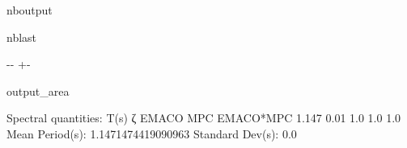 \documentclass[letterpaper,10pt,english]{sphinxmanual}
\begin{document}
\begin{sphinxuseclass}{nboutput}
\begin{sphinxuseclass}{nblast}
{

\kern-\sphinxverbatimsmallskipamount\kern-\baselineskip
\kern+\FrameHeightAdjust\kern-\fboxrule
\vspace{\nbsphinxcodecellspacing}

\begin{sphinxuseclass}{output_area}
\begin{sphinxuseclass}{}


\begin{sphinxVerbatim}[commandchars=\\\{\}]
Spectral quantities:
       T(s)        ζ        EMACO      MPC       EMACO*MPC
      1.147      0.01       1.0        1.0        1.0
Mean Period(s): 1.1471474419090963
Standard Dev(s): 0.0
\end{sphinxVerbatim}



\end{sphinxuseclass}
\end{sphinxuseclass}
}

\end{sphinxuseclass}
\end{sphinxuseclass}
\end{document}
